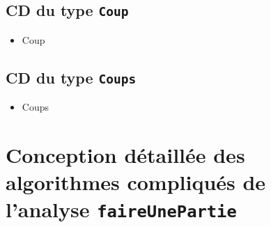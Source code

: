 \section{CD du type \tt{Coup}}
\begin{itemize}\item
\begin{algorithme}
\begin{enregistrement}{Coup}
\end{enregistrement}
\end{algorithme}
\end{itemize}

\section{CD du type \tt{Coups}}
\begin{itemize} \item
\begin{algorithme}
\begin{enregistrement}{Coups}
\end{enregistrement}
\end{algorithme}
\end{itemize}


\chapter{Conception détaillée des algorithmes compliqués de l'analyse \tt{faireUnePartie}}
\setcounter{section}{0}


